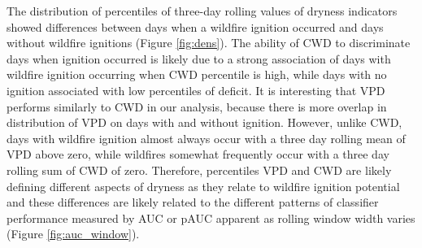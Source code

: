 \documentclass[11p]{article}
\begin{document}
The distribution of percentiles of three-day rolling values of dryness indicators showed differences between days when a wildfire ignition occurred and days without wildfire ignitions (Figure \ref{fig:dens}). The ability of CWD to discriminate days when ignition occurred is likely due to a strong association of days with wildfire ignition occurring when CWD percentile is high, while days with no ignition associated with low percentiles of deficit. It is interesting that VPD performs similarly to CWD in our analysis, because there is more overlap in distribution of VPD on days with and without ignition. However, unlike CWD, days with wildfire ignition almost always occur with a three day rolling mean of VPD above zero, while wildfires somewhat frequently occur with a three day rolling sum of CWD of zero. Therefore, percentiles VPD and CWD are likely defining different aspects of dryness as they relate to wildfire ignition potential and these differences are likely related to the different patterns of classifier performance measured by AUC or pAUC apparent as rolling window width varies (Figure \ref{fig:auc_window}).
\end{document}
